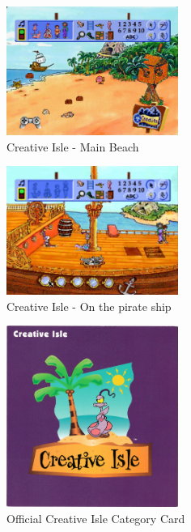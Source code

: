 \begin{figure}[H]
    \centering
    \includegraphics[width=0.5\textwidth]{"./Games/Creative/Images/CreativeIsleScreenshot1.jpg"}
    \caption{Creative Isle - Main Beach}
\end{figure}

\begin{figure}[H]
    \centering
    \includegraphics[width=0.5\textwidth]{"./Games/Creative/Images/CreativeIsleScreenshot2.jpg"}
    \caption{Creative Isle - On the pirate ship}
\end{figure}

\begin{figure}[H]
    \centering
    \includegraphics[width=0.5\textwidth]{"./Games/Creative/Images/CreativeIsleOfficialCategoryCard.jpg"}
    \caption{Official Creative Isle Category Card}
\end{figure}